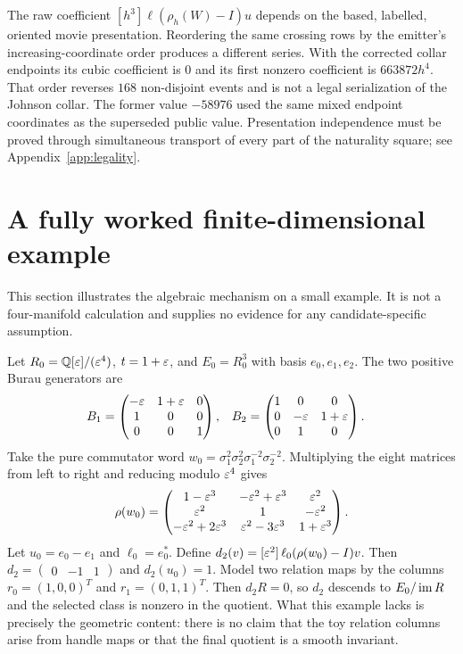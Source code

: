 \begin{remark}\label{rem:serialization}
The raw coefficient $[h^3]\ell(\rho_h(W)-I)u$ depends on the based,
labelled, oriented movie presentation.  Reordering the same crossing rows
by the emitter's increasing-coordinate order produces a different series.
With the corrected collar endpoints its cubic coefficient is $0$ and its first
nonzero coefficient is $663872h^4$.  That order reverses $168$ non-disjoint
events and is not a legal serialization of the Johnson collar.  The former
value $-58976$ used the same mixed endpoint coordinates as the superseded
public value.  Presentation independence must be proved through simultaneous
transport of every part of the naturality square; see
Appendix~\ref{app:legality}.
\end{remark}

\section{A fully worked finite-dimensional example}\label{sec:toy-example}

This section illustrates the algebraic mechanism on a small example.  It is
not a four-manifold calculation and supplies no evidence for any
candidate-specific assumption.

Let $R_0=\mathbb{Q}[\varepsilon]/(\varepsilon^4)$, $t=1+\varepsilon$, and $E_0=R_0^3$ with basis
$e_0,e_1,e_2$.  The two positive Burau generators are
\begin{align}
B_1&=
\begin{pmatrix}
-\varepsilon&1+\varepsilon&0\\
1&0&0\\
0&0&1
\end{pmatrix},
&
B_2&=
\begin{pmatrix}
1&0&0\\
0&-\varepsilon&1+\varepsilon\\
0&1&0
\end{pmatrix}.
\end{align}
Take the pure commutator word
$w_0=\sigma_1^2\sigma_2^2\sigma_1^{-2}\sigma_2^{-2}$.
Multiplying the eight matrices from left to right and reducing modulo
$\varepsilon^4$ gives
\[
\rho(w_0)=
\begin{pmatrix}
1-\varepsilon^3&-\varepsilon^2+\varepsilon^3&\varepsilon^2\\
\varepsilon^2&1&-\varepsilon^2\\
-\varepsilon^2+2\varepsilon^3&\varepsilon^2-3\varepsilon^3&1+\varepsilon^3
\end{pmatrix}.
\]
Let $u_0=e_0-e_1$ and $\ell_0=e_0^*$.  Define
$d_2(v)=[\varepsilon^2]\,\ell_0(\rho(w_0)-I)v$.
Then $d_2=\begin{pmatrix}0&-1&1\end{pmatrix}$ and $d_2(u_0)=1$.
Model two relation maps by the columns
$r_0=(1,0,0)^T$ and $r_1=(0,1,1)^T$.  Then $d_2R=0$, so $d_2$ descends to
$E_0/\operatorname{im} R$ and the selected class is nonzero in the quotient.  What this
example lacks is precisely the geometric content: there is no claim that the
toy relation columns arise from handle maps or that the final quotient is a
smooth invariant.
